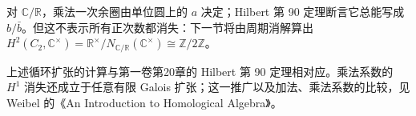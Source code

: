 对 \(\mathbb C/\mathbb R\)，乘法一次余圈由单位圆上的 \(a\) 决定；Hilbert 第 90 定理断言它总能写成 \(b/\bar b\)。但这不表示所有正次数都消失：下一节将由周期消解算出 \(H^2(C_2,\mathbb C^\times)=\mathbb R^\times/N_{\mathbb C/\mathbb R}(\mathbb C^\times)\cong\mathbb Z/2\mathbb Z\)。

\ProseParagraphBreak
上述循环扩张的计算与第一卷第20章的 Hilbert 第 90 定理相对应。乘法系数的 \(H^1\) 消失还成立于任意有限 Galois 扩张；这一推广以及加法、乘法系数的比较，见 Weibel 的《An Introduction to Homological Algebra》\cite[Hilbert's Theorem 90 6.3.7, Hilbert's Theorem 90 6.4.7, Example 6.4.8]{Weibel1994HomologicalAlgebra}。
